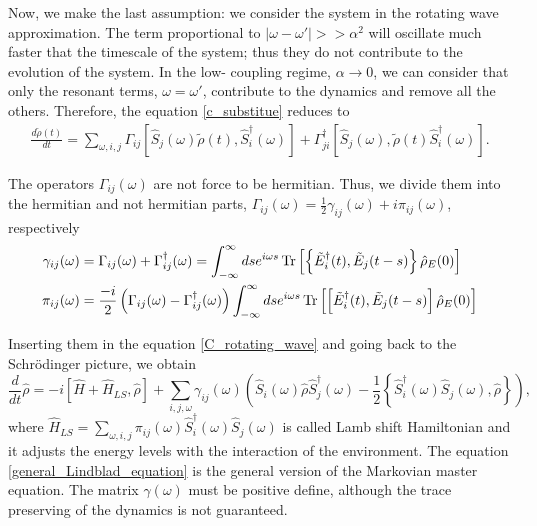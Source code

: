 Now, we make the last assumption: we consider the system in the rotating wave approximation. The term proportional to $|\omega-\omega'| >> \alpha^2$ will oscillate much faster that the timescale of the system; thus they do not contribute to the evolution of the system. In the low-
coupling regime, $\alpha\rightarrow 0$, we can consider that only the resonant terms, $\omega=\omega'$, contribute to the dynamics and
remove all the others. Therefore, the equation \eqref{c_substitue} reduces to
\begin{eqnarray}\label{C_rotating_wave}
    \frac{d\tilde\rho(t)}{dt} = \sum_{\omega,i,j}\Gamma_{ij}\left[\hat S_j(\omega)\tilde\rho(t),\hat S_i^\dagger(\omega)\right]+\Gamma_{ji}^\dagger\left[\hat S_j(\omega),\tilde\rho(t)\hat S_i^\dagger(\omega)\right].
\end{eqnarray}

The operators $\Gamma_{ij}(\omega)$ are not force to be hermitian. Thus, we divide them into the hermitian and not hermitian parts, $\Gamma_{ij}(\omega) =\frac{1}{2}\gamma_{ij}(\omega)+i\pi_{ij}(\omega)$, respectively
\begin{equation}
    \begin{split}
        \gamma_{ij}(\omega) &=   \Gamma_{ij}(\omega) + \Gamma_{ij}^\dagger(\omega) = \int_{-\infty}^\infty ds e^{i\omega s}\operatorname{Tr}\left[\left\{\tilde E_i^\dagger(t),\tilde E_j(t-s)\right\}\hat\rho_E(0)\right]\\
        \pi_{ij}(\omega) &= \frac{-i}{2}\left(\Gamma_{ij}(\omega)-\Gamma_{ij}^\dagger(\omega)\right)\int_{-\infty}^\infty ds e^{i\omega s}\operatorname{Tr}\left[\left[\tilde E_i^\dagger(t),\tilde E_j(t-s)\right]\hat\rho_E(0)\right]\\
    \end{split}
\end{equation}

Inserting them in the equation \eqref{C_rotating_wave} and going back to the Schrödinger picture, we obtain
\begin{equation}\label{general_Lindblad_equation}
    \frac{d}{dt}\hat\rho = -i\left[\hat H + \hat H_{LS},\hat\rho\right] + \sum_{i,j,\omega} \gamma_{ij}(\omega) \left(\hat S_i(\omega) \hat\rho \hat S^\dagger_j(\omega) - \frac{1}{2}\left\{ \hat S^\dagger_i(\omega)\hat S_j(\omega), \hat\rho\right\} \right),
\end{equation}
where $\hat H_{LS} = \sum_{\omega,i,j} \pi_{ij}(\omega)\hat S^\dagger_i(\omega)\hat S_j(\omega)$ is called Lamb shift Hamiltonian and it adjusts the energy levels with the interaction of the environment. The equation \eqref{general_Lindblad_equation} is the general version of the Markovian master equation. The matrix $\gamma(\omega)$ must be positive define, although the trace preserving of the dynamics is not guaranteed.

